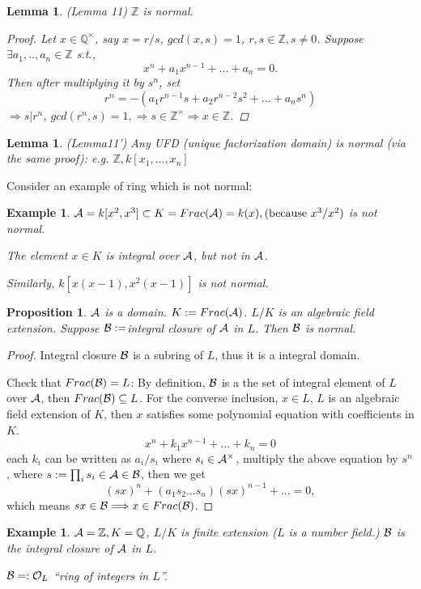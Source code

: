 \documentclass[11pt]{article}
\newtheorem{prop}[thm]{Proposition}
\newtheorem{lemma}[thm]{Lemma}
\newtheorem{ex}[thm]{Example}
\newcommand{\intg}{\mathbb Z}
\newcommand{\ratl}{\mathbb Q}
\newcommand{\cala}{{\cal A}}
\newcommand{\calb}{{\cal B}}
\newcommand{\calo}{{\cal O}}
\newcommand{\Lrta}{\Longrightarrow}
\begin{document}
\begin{lemma}\label{lem:integral_lemma11}(Lemma 11)
$\intg$ is normal.
\begin{proof}
Let $x\in \ratl^\times$, say $x=r/s$, $gcd(x,s)=1$, $r,s\in\intg, s\neq 0$. Suppose $\exists a_1,..,a_n\in\intg$ s.t.,
$$
x^n+a_1 x^{n-1}+...+a_n=0.
$$
Then after multiplying it by $s^n$, set
$$
r^n=-(a_1 r^{n-1}s+a_2 r^{n-2}s^2+...+a_n s^n)
$$
$\Lrta s|r^n$, $gcd(r^n,s)=1,\Lrta s\in \intg^\times\Lrta x\in \intg$.
\end{proof}
\end{lemma}

\begin{lemma}\label{lem:integral_lemma11'}(Lemma11')
Any UFD (unique factorization domain) is normal (via the same proof): e.g. $\intg,k[x_1,...,x_n]$
\end{lemma}

Consider an example of ring which is not normal:
\begin{ex}
$\cala=k[x^2,x^3]\subset K=Frac(\cala)=k(x),(\text{because } x^3/x^2)$ is not normal.

The element $x\in K$ is integral over $\cala$, but not in $\cala$.

Similarly, $k[x(x-1),x^2(x-1)]$ is not normal.
\end{ex}
\begin{prop}
$\cala$ is a domain. $K:=Frac(\cala)$. $L/K$ is an algebraic field extension. Suppose $\calb:=$integral closure of $\cala$ in $L$. Then $\calb$ is normal.
\end{prop}
\begin{proof}
Integral closure $\calb$ is a subring of $L$, thus it is a integral domain.

Check that $Frac(\calb)=L$: By definition, $\calb$ is a the set of integral element of $L$ over $\cala$, then $Frac(\calb)\subseteq L$. For the converse inclusion, $x\in L$, $L$ is an algebraic field extension of $K$, then $x$ satisfies some  polynomial equation with coefficients in $K$.
$$
x^n+k_1 x^{n-1}+...+k_n=0
$$
each $k_i$ can be written as $a_i/s_i$ where $s_i\in \cala^\times $, multiply the above equation by $s^n$, where $s:=\prod_i s_i\in \cala\in\calb$,
then we get
$$
(s x)^n+(a_1s_2...s_n) (s x)^{n-1}+...=0,
$$
which means $sx\in \calb\Lrta x\in Frac(\calb)$.
\end{proof}
\begin{ex}
$\cala=\intg, K=\ratl$, $L/K$ is finite extension ($L$ is a number field.) $\calb$ is the integral closure of $\cala$ in $L$.

$\calb=:\calo_L$ ``ring of integers in $L$''.
\end{ex}
\end{document}

